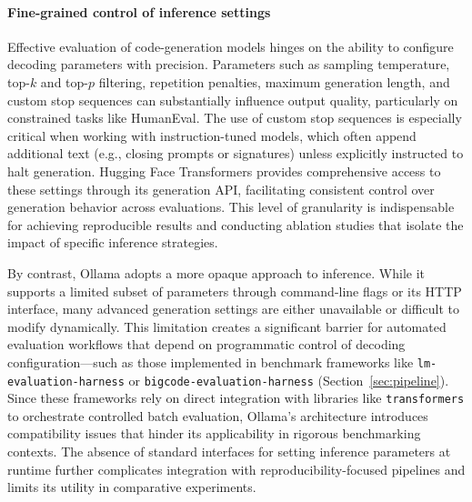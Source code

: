 \paragraph{Fine-grained control of inference settings}
Effective evaluation of code-generation models hinges on the ability to configure decoding parameters with precision. Parameters such as sampling temperature, top-$k$ and top-$p$ filtering, repetition penalties, maximum generation length, and custom stop sequences can substantially influence output quality, particularly on constrained tasks like HumanEval. The use of custom stop sequences is especially critical when working with instruction-tuned models, which often append additional text (e.g., closing prompts or signatures) unless explicitly instructed to halt generation. Hugging Face Transformers provides comprehensive access to these settings through its generation API, facilitating consistent control over generation behavior across evaluations. This level of granularity is indispensable for achieving reproducible results and conducting ablation studies that isolate the impact of specific inference strategies.

By contrast, Ollama adopts a more opaque approach to inference. While it supports a limited subset of parameters through command-line flags or its HTTP interface, many advanced generation settings are either unavailable or difficult to modify dynamically. This limitation creates a significant barrier for automated evaluation workflows that depend on programmatic control of decoding configuration---such as those implemented in benchmark frameworks like \texttt{lm-evaluation-harness} or \texttt{bigcode-evaluation-harness} (Section~\ref{sec:pipeline}). Since these frameworks rely on direct integration with libraries like \texttt{transformers} to orchestrate controlled batch evaluation, Ollama’s architecture introduces compatibility issues that hinder its applicability in rigorous benchmarking contexts. The absence of standard interfaces for setting inference parameters at runtime further complicates integration with reproducibility-focused pipelines and limits its utility in comparative experiments.

